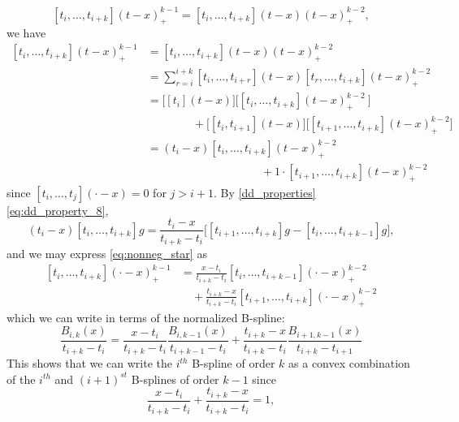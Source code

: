 \documentclass[12pt]{article}
\theoremstyle{definition}
\begin{document}
\begin{enumerate}
\[
\left[t_i,\dots,t_{i+k} \right]\left(t-x\right)_+^{k-1} = \left[t_i,\dots,t_{i+k} \right]\left(t-x\right) \left(t-x\right)_+^{k-2},
\] 
we have
\begin{align}
\left[t_i,\dots,t_{i+k} \right]\left(t-x\right)_+^{k-1} &=  \left[t_i,\dots,t_{i+k} \right]\left(t-x\right) \left(t-x\right)_+^{k-2} \nonumber\\
&= \sum_{r=i}^{i+k}\left[t_i,\dots,t_{i+r} \right] \left(t-x\right)\left[ t_r,\dots,t_{i+k}\right]\left(t-x\right)_+^{k-2} \nonumber \\
&= \bigg[ \left[t_i\right]\left(t-x \right) \bigg]\bigg[ \left[ t_i,\dots,t_{i+k}\right]\left(t-x\right)_+^{k-2}\ \bigg]\nonumber \\
& \qquad \qquad + \bigg[ \left[t_i,t_{i+1}\right]\left(t-x \right) \bigg]\bigg[ \left[ t_{i+1},\dots,t_{i+k}\right]\left(t-x\right)_+^{k-2} \bigg] \nonumber \\
&= \left(t_i-x \right) \left[ t_{i},\dots,t_{i+k}\right]\left(t-x\right)_+^{k-2} \nonumber \\
& \qquad \qquad \qquad \qquad \qquad +  1 \cdot \left[ t_{i+1},\dots,t_{i+k}\right]\left(t-x\right)_+^{k-2} \label{eq:nonneg_star}
\end{align}
since $\left[ t_i,\dots,t_j\right]\left(\cdot-x\right) = 0$ for $j>i+1$. By \ref{dd_properties} \ref{eq:dd_property_8}, 
\[
\left(t_i-x \right) \left[ t_{i},\dots,t_{i+k}\right]g = \frac{t_i-x}{t_{i+k}-t_{i}}\bigg[\left[ t_{i+1},\dots,t_{i+k}\right]g -\left[ t_{i},\dots,t_{i+k-1}\right]g   \bigg],
\]
and we may express \ref{eq:nonneg_star} as 
\begin{align*}
\left[ t_{i},\dots,t_{i+k}\right]\left(\cdot - x\right)^{k-1}_+ &= \frac{x-t_i}{t_{i+k}-t_{i}}\left[ t_{i},\dots,t_{i+k-1}\right] \left(\cdot-x\right)_+^{k-2}  \\
& \quad + \frac{t_{i+k}-x}{t_{i+k}-t_{i}}\left[ t_{i+1},\dots,t_{i+k}\right] \left(\cdot-x\right)_+^{k-2} 
\end{align*}
which we can write in terms of the normalized B-spline:
\begin{equation} \label{eq:nonneg_starstar}
\frac{B_{i,k}\left(x\right)}{t_{i+k}-t_i} = \frac{x-t_i}{t_{i+k}-t_{i}}\frac{B_{i,k-1}\left(x\right)}{t_{i+k-1}-t_i} + \frac{t_{i+k}-x}{t_{i+k}-t_{i}} \frac{B_{i+1,k-1}\left(x\right)}{t_{i+k}-t_{i+1}}
\end{equation}
This shows that we can write the $i^{th}$ B-spline of order $k$ as a convex combination of the $i^{th}$ and $\left(i+1\right)^{st}$ B-splines of order $k-1$ since 
\[
\frac{x-t_i}{t_{i+k}-t_{i}} + \frac{t_{i+k}-x}{t_{i+k}-t_{i}}  = 1,
\]
\end{enumerate}
\end{document}
